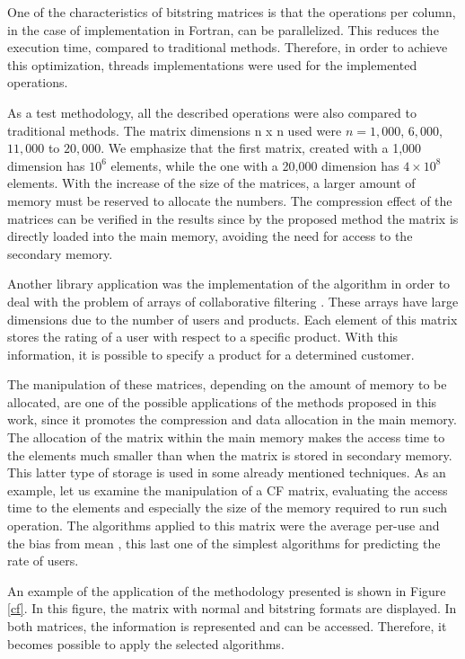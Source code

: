 \documentclass[10pt]{article}
\begin{document}
One of the characteristics of bitstring matrices is that the operations per column, in the case of implementation in 
Fortran, can be parallelized. This reduces the execution time, compared to traditional methods. Therefore, in order to 
achieve this optimization, threads implementations were used for the implemented operations.

As a test methodology, all the described operations were also compared to traditional methods. The matrix dimensions n x 
n used were $n = 1,000$, $6,000$, $11,000$ to $20,000$. We emphasize that the first matrix,  created with a 1,000 
dimension has $10^6$ elements, while the one with a 20,000 dimension has $4 \times 10^8$ elements. With the increase of 
the size of the matrices, a larger amount of memory must be reserved to allocate the numbers. The compression effect of 
the matrices can be verified in the results since by the proposed method the matrix is ​​directly loaded into the main 
memory, avoiding the need for access to the secondary memory.

Another library application was the implementation of the algorithm in order to deal with the problem of arrays of 
collaborative filtering \cite{cf}. These arrays have large dimensions due to the number of users and products. Each 
element of this matrix stores the rating of a user with respect to a specific product. With this information, it is 
possible to specify a product for a determined customer.

The manipulation of these matrices, depending on the amount of memory to be allocated, are one of the possible 
applications of the methods proposed in this work, since it promotes the compression and data allocation in the main 
memory. The allocation of the matrix within the main memory makes the access time to the elements much smaller than when 
the matrix is stored in secondary memory. This latter type of storage is used in some already mentioned techniques. As 
an example, let us examine the manipulation of a CF matrix, evaluating the access time to the elements and especially 
the size of the memory required to run such operation. The algorithms applied to this matrix were the average per-use 
and the bias from mean \cite{cf}, this last one of the simplest algorithms for predicting the rate of users.

An example of the application of the methodology presented is shown in Figure \ref{cf}. In this figure, the matrix with 
normal and bitstring formats are displayed. In both matrices, the information is represented and can be accessed. 
Therefore, it becomes possible to apply the selected algorithms.
\end{document}
